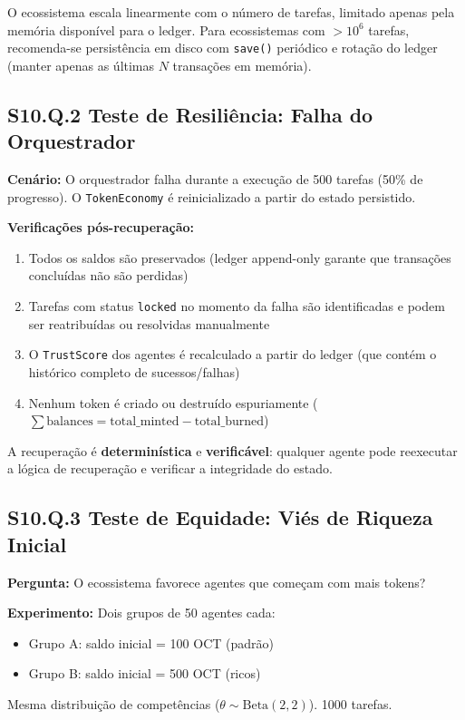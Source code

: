 O ecossistema escala linearmente com o número de tarefas, limitado apenas pela memória disponível para o ledger. Para ecossistemas com $> 10^6$ tarefas, recomenda-se persistência em disco com \texttt{save()} periódico e rotação do ledger (manter apenas as últimas $N$ transações em memória).

\subsection*{S10.Q.2 Teste de Resiliência: Falha do Orquestrador}

\textbf{Cenário:} O orquestrador falha durante a execução de 500 tarefas (50\% de progresso). O \texttt{TokenEconomy} é reinicializado a partir do estado persistido.

\textbf{Verificações pós-recuperação:}
\begin{enumerate}
    \item Todos os saldos são preservados (ledger append-only garante que transações concluídas não são perdidas)
    \item Tarefas com status \texttt{locked} no momento da falha são identificadas e podem ser reatribuídas ou resolvidas manualmente
    \item O \texttt{TrustScore} dos agentes é recalculado a partir do ledger (que contém o histórico completo de sucessos/falhas)
    \item Nenhum token é criado ou destruído espuriamente ($\sum \text{balances} = \text{total\_minted} - \text{total\_burned}$)
\end{enumerate}

A recuperação é \textbf{determinística} e \textbf{verificável}: qualquer agente pode reexecutar a lógica de recuperação e verificar a integridade do estado.

\subsection*{S10.Q.3 Teste de Equidade: Viés de Riqueza Inicial}

\textbf{Pergunta:} O ecossistema favorece agentes que começam com mais tokens?

\textbf{Experimento:} Dois grupos de 50 agentes cada:
\begin{itemize}
    \item Grupo A: saldo inicial = 100 OCT (padrão)
    \item Grupo B: saldo inicial = 500 OCT (ricos)
\end{itemize}
Mesma distribuição de competências ($\theta \sim \text{Beta}(2,2)$). 1000 tarefas.

